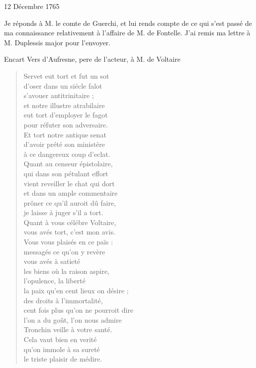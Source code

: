                      \begin{diary}{12 Décembre 1765}{}

                         Je réponds à M. le comte de
                              Guerchi, et lui
                           rends compte de ce qui s'est passé de ma
                           connaissance relativement à l'affaire de M.
                              de Fontelle. J'ai remis ma lettre à M. Duplessis
                           major pour l'envoyer. \bigskip


                     \end{diary}


                     \begin{diary}{Encart}{} Vers d'Aufresne, pere de
                              l'acteur,
                              à M. de Voltaire
                           \bigskip


                              \begin{verse}Servet eut tort et fut un
                                    sot\\d'oser dans un siécle falot\\s'avouer antitrinitaire ;\\et notre illustre atrabilaire\\eut tort d'employer le fagot\\pour réfuter son adversaire.\\Et tort notre antique senat\\d'avoir prété son ministére\\à ce dangereux coup d'eclat.\\Quant au censeur épistolaire,\\qui dans son pétulant effort\\vient reveiller le chat qui dort\\et dans un ample commentaire\\prôner ce qu'il auroit dû faire,\\je laisse à juger s'il a tort.\\Quant à vous célébre Voltaire,\\vous avés tort, c'est mon avis.\\Vous vous
                                    plaisés en ce païs :\\messagés ce qu'on y revère\\vous avés à satieté\\les biens où la raison aspire,\\l'opulence, la liberté\\la paix qu'en cent lieux on désire ;\\des droits à l'immortalité,\\cent fois plus qu'on ne pourroit dire\\l'on a du goût, l'on nous admire\\Tronchin veille à votre santé.\\Cela vaut bien en verité\\qu'on immole à sa sureté\\le triste plaisir de médire.\\\end{verse}
        \bigskip



\end{diary}
